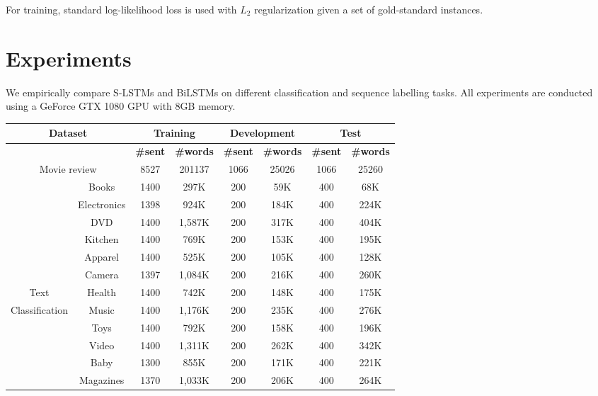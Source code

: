 \documentclass[11pt,a4paper]{article}
\begin{document}
For training, standard log-likelihood loss is used with $L_2$ regularization given a set of gold-standard instances. 


\section{Experiments}
We empirically compare S-LSTMs and BiLSTMs on different classification and sequence labelling tasks. 
All experiments are conducted using a GeForce GTX 1080 GPU with 8GB memory. 


\begin{table}[t]
	\centering
	\scriptsize
	\tabcolsep=0.03cm
	\begin{tabular}{|ccc|c|c|c|c|c|c|}
		\hline
		\multicolumn{3}{|c|}{\textbf{Dataset}} &\multicolumn{2}{|c|}{\textbf{Training}} &\multicolumn{2}{|c|}{\textbf{Development}}& \multicolumn{2}{|c|}{\textbf{Test}}\\
		\hline
		\multicolumn{3}{|c|}{} &\textbf{\#sent}&\textbf{\#words} &\textbf{\#sent}&\textbf{\#words}& \textbf{\#sent}&\textbf{\#words}\\
		\hline
		\multicolumn{3}{|c|}{Movie review \cite{pang2008opinion}} &8527&201137&1066&25026&1066&25260\\
		\hline
		  &  \multicolumn{2}{|c|}{Books} &1400 &297K&200&59K&400&68K\\
		  & \multicolumn{2}{|c|}{Electronics} &1398 &924K&200&184K&400&224K\\
		  & \multicolumn{2}{|c|}{DVD}&1400 &1,587K&200&317K&400&404K\\
		  & \multicolumn{2}{|c|}{Kitchen}&1400 &769K&200&153K&400&195K\\
		  & \multicolumn{2}{|c|}{Apparel}&1400 &525K&200&105K&400&128K\\
		  & \multicolumn{2}{|c|}{Camera}&1397 &1,084K&200&216K&400&260K\\
		Text  & \multicolumn{2}{|c|}{Health}&1400&742K&200&148K&400&175K\\
		Classification  & \multicolumn{2}{|c|}{Music}&1400 &1,176K&200&235K&400&276K\\
		\cite{liu2017adversarial}  & \multicolumn{2}{|c|}{Toys} &1400&792K&200&158K&400&196K\\
		  & \multicolumn{2}{|c|}{Video}& 1400 &1,311K&200&262K&400&342K\\
		  & \multicolumn{2}{|c|}{Baby}& 1300 &855K&200&171K&400&221K\\
		  & \multicolumn{2}{|c|}{Magazines}& 1370 &1,033K&200&206K&400&264K\\

\end{tabular}
\end{table}
\end{document}
